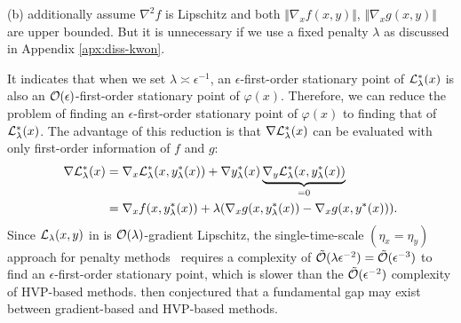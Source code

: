 \documentclass[twoside,11pt]{article}
\begin{document}
\begin{table}[t]
\begin{tablenotes}
{  \item {\color{blue} (b)} {\citet{kwon2023fully} additionally assume $\nabla^2 f$ is Lipschitz and both $\Vert \nabla_x f(x,y)\Vert$, $\Vert \nabla_x g(x,y) \Vert $ are upper bounded. But it is unnecessary if we use a fixed penalty $\lambda$ as discussed in Appendix \ref{apx:diss-kwon}.}
   }
   
    \end{tablenotes}
\end{table}

It indicates that when we set $\lambda \asymp \epsilon^{-1}$, an $\epsilon$-first-order stationary point of ${\mathcal{L}}_{\lambda}^*(x)$ is also an ${\mathcal{O}}(\epsilon)$-first-order stationary point of $\varphi(x)$. Therefore, we
can reduce the problem of finding an $\epsilon$-first-order stationary point of $\varphi(x)$ to finding that of ${\mathcal{L}}_{\lambda}^*(x)$.
The advantage of this reduction is that 
 $\nabla {\mathcal{L}}_{\lambda}^*(x)$ can be evaluated with only first-order information of $f$ and $g$:
 \begin{align} \label{eq:nabla-Lag}
 \begin{split}
     \nabla {\mathcal{L}}_{\lambda}^*(x) &= 
     \nabla_x {\mathcal{L}}_{\lambda}^*(x,y_{\lambda}^*(x)) + \nabla y_{\lambda}^*(x) \underbrace{\nabla_y {\mathcal{L}}_{\lambda}^*(x,y_{\lambda}^*(x))}_{=0} 
     \\
     &=\nabla_x f(x, y_{\lambda}^*(x)) + \lambda ( \nabla_x g(x,y_{\lambda}^*(x)) - \nabla_x g(x,y^*(x))).
 \end{split}
 \end{align}
Since ${\mathcal{L}}_{\lambda}(x,y)$ in  is ${\mathcal{O}}(\lambda)$-gradient Lipschitz, {the single-time-scale $(\eta_x = \eta_y)$ approach for penalty methods~\citep{kwon2023fully,shen2023penalty}} requires a complexity of $\tilde {{\mathcal{O}}}(\lambda \epsilon^{-2}) = \tilde {{\mathcal{O}}}(\epsilon^{-3} )$
to find an $\epsilon$-first-order stationary point, which is slower than the $\tilde {{\mathcal{O}}}(\epsilon^{-2})$ complexity of HVP-based methods. \citet{kwon2023fully} then conjectured that a fundamental gap may exist between gradient-based and HVP-based methods.
\end{document}
